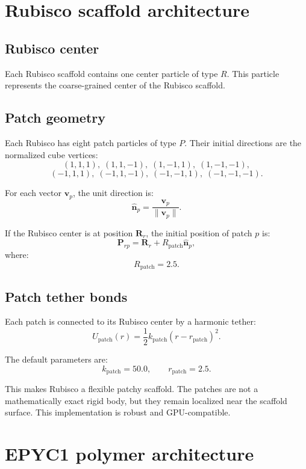 \documentclass[11pt]{article}
\begin{document}
\section{Rubisco scaffold architecture}

\subsection{Rubisco center}

Each Rubisco scaffold contains one center particle of type \(R\). This particle represents the coarse-grained center of the Rubisco scaffold.

\subsection{Patch geometry}

Each Rubisco has eight patch particles of type \(P\). Their initial directions are the normalized cube vertices:
\[
(1,1,1),\; (1,1,-1),\; (1,-1,1),\; (1,-1,-1),
\]
\[
(-1,1,1),\; (-1,1,-1),\; (-1,-1,1),\; (-1,-1,-1).
\]

For each vector \(\mathbf{v}_p\), the unit direction is:
\[
\hat{\mathbf{n}}_p = \frac{\mathbf{v}_p}{\|\mathbf{v}_p\|}.
\]

If the Rubisco center is at position \(\mathbf{R}_r\), the initial position of patch \(p\) is:
\[
\mathbf{P}_{rp} = \mathbf{R}_r + R_{\mathrm{patch}}\hat{\mathbf{n}}_p,
\]
where:
\[
R_{\mathrm{patch}} = 2.5.
\]

\subsection{Patch tether bonds}

Each patch is connected to its Rubisco center by a harmonic tether:
\[
U_{\mathrm{patch}}(r)
=
\frac{1}{2}k_{\mathrm{patch}}(r-r_{\mathrm{patch}})^2.
\]

The default parameters are:
\[
k_{\mathrm{patch}} = 50.0,
\qquad
r_{\mathrm{patch}} = 2.5.
\]

This makes Rubisco a flexible patchy scaffold. The patches are not a mathematically exact rigid body, but they remain localized near the scaffold surface. This implementation is robust and GPU-compatible.

\section{EPYC1 polymer architecture}
\end{document}
